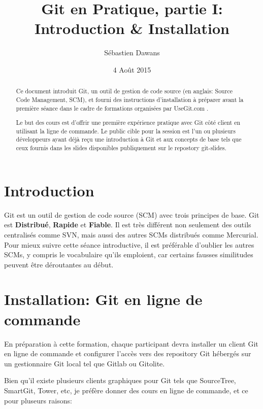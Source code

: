 \documentclass{../../common/tufte-latex/tufte-handout}
\title{Git en Pratique, partie I: Introduction \& Installation}
\author{S\'ebastien Dawans}
\date{4 Ao\^ut 2015} %
\begin{document}
\maketitle%

\begin{abstract}
\noindent
Ce document introduit Git, un outil de gestion de code source (en anglais: Source Code Management, SCM), et fourni des instructions d'installation à préparer avant la première séance dans le cadre de formations organisées par UseGit.com .

Le but des cours est d'offrir une première expérience pratique avec Git côté client en utilisant la ligne de commande. 
Le public cible pour la session est l'un ou plusieurs développeurs ayant déjà reçu une introduction à Git et aux concepts de base tels que ceux fournis dans les slides disponibles publiquement sur le repostory git-slides. 
\end{abstract}


\section{Introduction}\label{sec:intro}

Git est un outil de gestion de code source (SCM) avec trois principes de base.
Git est \textbf{Distribué}, \textbf{Rapide} et \textbf{Fiable}.
Il est très différent non seulement des outils centralisés comme SVN, mais aussi des autres SCMs distribués comme Mercurial.
Pour mieux suivre cette séance introductive, il est préférable d'oublier les autres SCMs, y compris le vocabulaire qu'ils emploient, car certains fausses similitudes peuvent être déroutantes au début.

\section{Installation: Git en ligne de commande}

En préparation à cette formation, chaque participant devra installer un client Git en ligne de commande et configurer l'accès vers des repository Git hébergés sur un gestionnaire Git local tel que Gitlab ou Gitolite.

Bien qu'il existe plusieurs clients graphiques pour Git tels que SourceTree, SmartGit, Tower, etc, je préfère donner des cours en ligne de commande, et ce pour pluseurs raisons:
\end{document}
